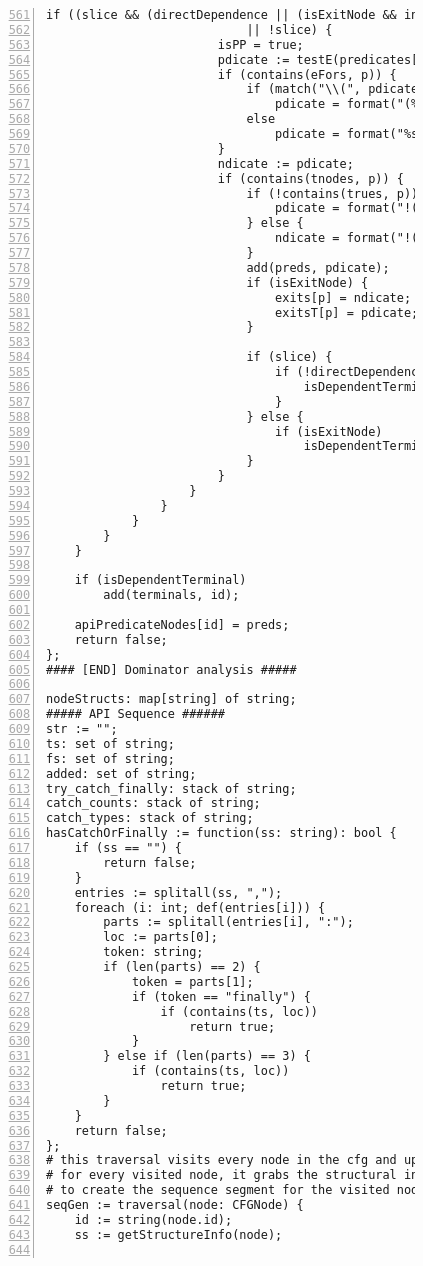 \begin{figure}[ht!]
\begin{lstlisting}[numbers=left, tabsize=4, escapechar=@, caption={API Usage Mining Analysis},label={lst:aun-code},  firstline = 561, firstnumber = 561, lastline = 621]
                    if ((slice && (directDependence || (isExitNode && indirectDependence))) 
                            || !slice) {
                        isPP = true;
                        pdicate := testE(predicates[p]);
                        if (contains(eFors, p)) {
                            if (match("\\(", pdicate)) 
                                pdicate = format("(%s).size() > 0", pdicate);
                            else
                                pdicate = format("%s.size() > 0", pdicate);
                        }
                        ndicate := pdicate;
                        if (contains(tnodes, p)) {
                            if (!contains(trues, p)) {
                                pdicate = format("!(%s)", pdicate);
                            } else {
                                ndicate = format("!(%s)", ndicate);    
                            }
                            add(preds, pdicate);    
                            if (isExitNode) {
                                exits[p] = ndicate;
                                exitsT[p] = pdicate;
                            }

                            if (slice) {
                                if (!directDependence) {
                                    isDependentTerminal = true;
                                }
                            } else {
                                if (isExitNode)
                                    isDependentTerminal = true;	
                            }
                        }
                    } 
                } 
            }
        }
    } 

    if (isDependentTerminal)
        add(terminals, id);
    
    apiPredicateNodes[id] = preds;
    return false;
};
#### [END] Dominator analysis #####

nodeStructs: map[string] of string;
##### API Sequence ######
str := "";
ts: set of string;
fs: set of string;
added: set of string;
try_catch_finally: stack of string;
catch_counts: stack of string;
catch_types: stack of string;
hasCatchOrFinally := function(ss: string): bool {
    if (ss == "") {
        return false;    
    }
    entries := splitall(ss, ",");
    foreach (i: int; def(entries[i])) {
        parts := splitall(entries[i], ":");
        loc := parts[0];
        token: string;
        if (len(parts) == 2) {
            token = parts[1];
            if (token == "finally") {
                if (contains(ts, loc))
                    return true;
            }
        } else if (len(parts) == 3) {
            if (contains(ts, loc))
                return true;
        }
    }
    return false;
};
# this traversal visits every node in the cfg and updates the sequence
# for every visited node, it grabs the structural information, api calls, and preconditions
# to create the sequence segment for the visited node.
seqGen := traversal(node: CFGNode) {
	id := string(node.id);
	ss := getStructureInfo(node);
	

\end{lstlisting}
\end{figure}

